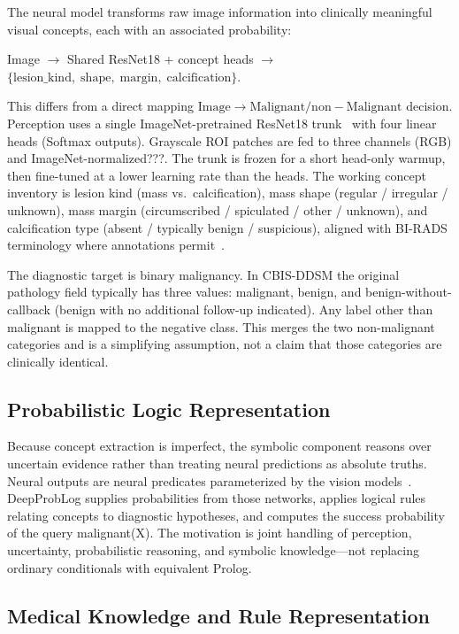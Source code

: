 The neural model transforms raw image information into clinically meaningful visual concepts, each with an associated probability:
\begin{center}
\small
Image $\rightarrow$ Shared ResNet18 + concept heads $\rightarrow$ $\{\mathrm{lesion\_kind},\;\mathrm{shape},\;\mathrm{margin},\;\mathrm{calcification}\}$.
\end{center}
This differs from a direct mapping $\mathrm{Image}\rightarrow\mathrm{Malignant/ non-Malignant}$ decision. Perception uses a single ImageNet-pretrained ResNet18 trunk~\cite{he2016resnet} with four linear heads (Softmax outputs). Grayscale ROI patches are fed to three channels (RGB) and ImageNet-normalized???. The trunk is frozen for a short head-only warmup, then fine-tuned at a lower learning rate than the heads. The working concept inventory is lesion kind (mass vs.\ calcification), mass shape (regular / irregular / unknown), mass margin (circumscribed / spiculated / other / unknown), and calcification type (absent / typically benign / suspicious), aligned with BI-RADS terminology where annotations permit~\cite{acr2013birads,lee2017cbis}.

The diagnostic target is binary malignancy. In CBIS-DDSM the original pathology field typically has three values: malignant, benign, and benign-without-callback (benign with no additional follow-up indicated). Any label other than malignant is mapped to the negative class. This merges the two non-malignant categories and is a simplifying assumption, not a claim that those categories are clinically identical.

\subsection{Probabilistic Logic Representation}
\label{sec:problog}

Because concept extraction is imperfect, the symbolic component reasons over uncertain evidence rather than treating neural predictions as absolute truths. Neural outputs are neural predicates parameterized by the vision models~\cite{deraedt2007problog,manhaeve2018deepproblog}. DeepProbLog supplies probabilities from those networks, applies logical rules relating concepts to diagnostic hypotheses, and computes the success probability of the query malignant(X). The motivation is joint handling of perception, uncertainty, probabilistic reasoning, and symbolic knowledge---not replacing ordinary conditionals with equivalent Prolog.

\subsection{Medical Knowledge and Rule Representation}
\label{sec:knowledge}

